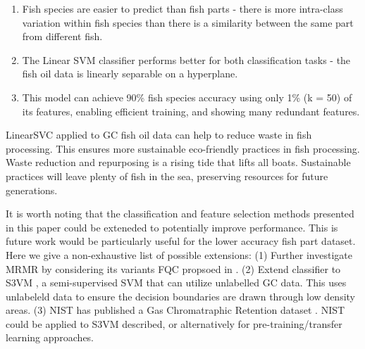 \documentclass[runningheads]{llncs}
\begin{document}
\begin{enumerate}
  \item Fish species are easier to predict than fish parts - there is more intra-class variation within fish species than there is a similarity between the same part from different fish.
  \item The Linear SVM classifier performs better for both classification tasks - the fish oil data is linearly separable on a hyperplane.
  \item This model can achieve 90\% fish species accuracy using only 1\% (k = 50) of its features, enabling efficient training, and showing many redundant features. 
\end{enumerate}

LinearSVC applied to GC fish oil data can help to reduce waste in fish processing. 
This ensures more sustainable eco-friendly practices in fish processing.
Waste reduction and repurposing is a rising tide that lifts all boats.
Sustainable practices will leave plenty of fish in the sea, preserving resources for future generations. 


It is worth noting that the classification and feature selection methods presented in this paper could be exteneded to potentially improve performance. 
This is future work would be particularly useful for the lower accuracy fish part dataset. 
Here we give a non-exhaustive list of possible extensions: 
(1) Further investigate MRMR by considering its variants FQC propsoed in \cite{zhao2019maximum}. 
(2) Extend classifier to S3VM \cite{zemmal2016adaptative}, a semi-supervised SVM that can utilize unlabelled GC data. 
This uses unlabeleld data to ensure the decision boundaries are drawn through low density areas.
(3) NIST has published a Gas Chromatraphic Retention dataset \cite{kovats1958gas}. 
NIST could be applied to S3VM described, or alternatively for pre-training/transfer learning approaches. 



\end{document}

